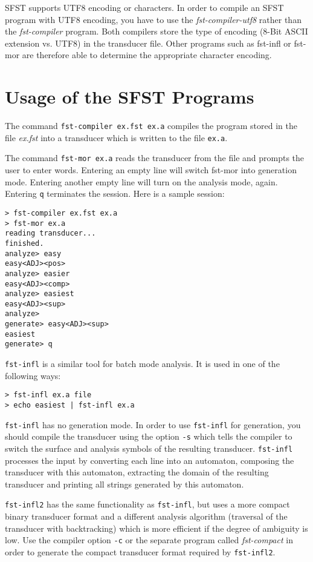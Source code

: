 \documentclass{article}
\begin{document}
SFST supports UTF8 encoding or characters. In order to compile an SFST
program with UTF8 encoding, you have to use the
\emph{fst-compiler-utf8} rather than the \emph{fst-compiler} program.
Both compilers store the type of encoding (8-Bit ASCII extension vs.
UTF8) in the transducer file. Other programs such as fst-infl or
fst-mor are therefore able to determine the appropriate character
encoding.


\section{Usage of the SFST Programs}

The command \texttt{fst-compiler ex.fst ex.a} compiles the program
stored in the file \emph{ex.fst} into a transducer which is written to
the file \texttt{ex.a}.

The command \texttt{fst-mor ex.a} reads the transducer from the file
and prompts the user to enter words. Entering an empty line will
switch fst-mor into generation mode. Entering another empty line will
turn on the analysis mode, again. Entering \texttt{q} terminates the
session.  Here is a sample session:
\begin{verbatim}
> fst-compiler ex.fst ex.a
> fst-mor ex.a
reading transducer...
finished.
analyze> easy
easy<ADJ><pos>
analyze> easier
easy<ADJ><comp>
analyze> easiest
easy<ADJ><sup>
analyze>
generate> easy<ADJ><sup>
easiest
generate> q
\end{verbatim}
\texttt{fst-infl} is a similar tool for batch mode analysis. It is
used in one of the following ways:
\begin{verbatim}
> fst-infl ex.a file
> echo easiest | fst-infl ex.a
\end{verbatim}
\texttt{fst-infl} has no generation mode. In order to use
\texttt{fst-infl} for generation, you should compile the transducer
using the option \texttt{-s} which tells the compiler to switch the
surface and analysis symbols of the resulting transducer.
\texttt{fst-infl} processes the input by converting each line into an
automaton, composing the transducer with this automaton, extracting
the domain of the resulting transducer and printing all strings
generated by this automaton.

\texttt{fst-infl2} has the same functionality as \texttt{fst-infl},
but uses a more compact binary transducer format and a different
analysis algorithm (traversal of the transducer with backtracking)
which is more efficient if the degree of ambiguity is low. Use the
compiler option \texttt{-c} or the separate program called
\emph{fst-compact} in order to generate the compact transducer format
required by \texttt{fst-infl2}.
\end{document}
